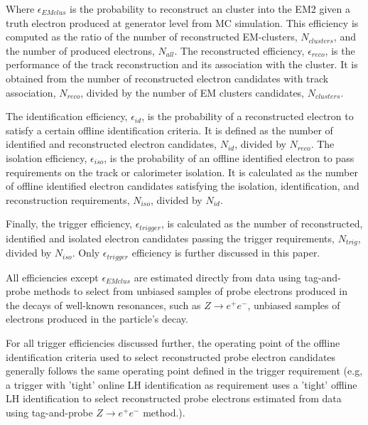 Where $\epsilon_{EMclus}$ is the probability to reconstruct an cluster into the EM2 given a truth electron produced at generator level from MC simulation. This efficiency is computed as the ratio of the number of reconstructed EM-clusters, $N_{clusters}$, and the number of produced electrons, $N_{all}$. The reconstructed efficiency, $\epsilon_{reco}$, is the performance of the track reconstruction and its association with the cluster. It is obtained from the number of reconstructed electron candidates with track association, $N_{reco}$, divided by the number of EM clusters candidates, $N_{clusters}$. 

The identification efficiency, $\epsilon_{id}$, is the probability of a reconstructed electron to satisfy a certain offline identification criteria. It is defined as the number of identified and reconstructed electron candidates, $N_{id}$, divided by $N_{reco}$. The isolation efficiency, $\epsilon_{iso}$, is the probability of an offline identified electron to pass requirements on the track or calorimeter isolation. It is calculated as the number of offline identified electron candidates satisfying the isolation, identification, and reconstruction requirements, $N_{iso}$, divided by $N_{id}$.

Finally, the trigger efficiency, $\epsilon_{trigger}$, is calculated as the number of reconstructed, identified and isolated electron candidates passing the trigger requirements, $N_{trig}$, divided by $N_{iso}$. 
Only $\epsilon_{trigger}$ efficiency is further discussed in this paper.

All efficiencies except $\epsilon_{EMclus}$ are estimated directly from data using tag-and-probe methods to select from unbiased samples of probe electrons produced in the decays of well-known resonances, such as $Z\rightarrow e^{+}e^{-}$, unbiased samples of electrons produced in the particle's decay. 

For all trigger efficiencies discussed further, the operating point of the offline identification criteria used to select reconstructed probe electron candidates generally follows the same operating point defined in the trigger requirement (e.g, a trigger with 'tight' online LH identification as requirement uses a 'tight' offline LH identification to select reconstructed probe electrons estimated from data using tag-and-probe $Z\rightarrow e^+e^-$ method.).










